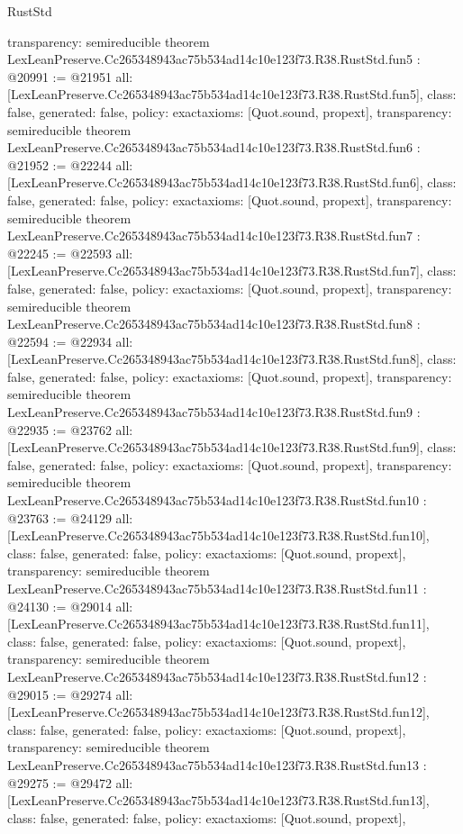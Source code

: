 \begin{lexlean}{RustStd}
\begin{coremodule}
{  transparency: semireducible
}
theorem LexLeanPreserve.Cc265348943ac75b534ad14c10e123f73.R38.RustStd.fun5 : @20991 := @21951 {
  all: [LexLeanPreserve.Cc265348943ac75b534ad14c10e123f73.R38.RustStd.fun5],
  class: false,
  generated: false,
  policy: exact{axioms: [Quot.sound, propext]},
  transparency: semireducible
}
theorem LexLeanPreserve.Cc265348943ac75b534ad14c10e123f73.R38.RustStd.fun6 : @21952 := @22244 {
  all: [LexLeanPreserve.Cc265348943ac75b534ad14c10e123f73.R38.RustStd.fun6],
  class: false,
  generated: false,
  policy: exact{axioms: [Quot.sound, propext]},
  transparency: semireducible
}
theorem LexLeanPreserve.Cc265348943ac75b534ad14c10e123f73.R38.RustStd.fun7 : @22245 := @22593 {
  all: [LexLeanPreserve.Cc265348943ac75b534ad14c10e123f73.R38.RustStd.fun7],
  class: false,
  generated: false,
  policy: exact{axioms: [Quot.sound, propext]},
  transparency: semireducible
}
theorem LexLeanPreserve.Cc265348943ac75b534ad14c10e123f73.R38.RustStd.fun8 : @22594 := @22934 {
  all: [LexLeanPreserve.Cc265348943ac75b534ad14c10e123f73.R38.RustStd.fun8],
  class: false,
  generated: false,
  policy: exact{axioms: [Quot.sound, propext]},
  transparency: semireducible
}
theorem LexLeanPreserve.Cc265348943ac75b534ad14c10e123f73.R38.RustStd.fun9 : @22935 := @23762 {
  all: [LexLeanPreserve.Cc265348943ac75b534ad14c10e123f73.R38.RustStd.fun9],
  class: false,
  generated: false,
  policy: exact{axioms: [Quot.sound, propext]},
  transparency: semireducible
}
theorem LexLeanPreserve.Cc265348943ac75b534ad14c10e123f73.R38.RustStd.fun10 : @23763 := @24129 {
  all: [LexLeanPreserve.Cc265348943ac75b534ad14c10e123f73.R38.RustStd.fun10],
  class: false,
  generated: false,
  policy: exact{axioms: [Quot.sound, propext]},
  transparency: semireducible
}
theorem LexLeanPreserve.Cc265348943ac75b534ad14c10e123f73.R38.RustStd.fun11 : @24130 := @29014 {
  all: [LexLeanPreserve.Cc265348943ac75b534ad14c10e123f73.R38.RustStd.fun11],
  class: false,
  generated: false,
  policy: exact{axioms: [Quot.sound, propext]},
  transparency: semireducible
}
theorem LexLeanPreserve.Cc265348943ac75b534ad14c10e123f73.R38.RustStd.fun12 : @29015 := @29274 {
  all: [LexLeanPreserve.Cc265348943ac75b534ad14c10e123f73.R38.RustStd.fun12],
  class: false,
  generated: false,
  policy: exact{axioms: [Quot.sound, propext]},
  transparency: semireducible
}
theorem LexLeanPreserve.Cc265348943ac75b534ad14c10e123f73.R38.RustStd.fun13 : @29275 := @29472 {
  all: [LexLeanPreserve.Cc265348943ac75b534ad14c10e123f73.R38.RustStd.fun13],
  class: false,
  generated: false,
  policy: exact{axioms: [Quot.sound, propext]},
}
\end{coremodule}
\end{lexlean}
